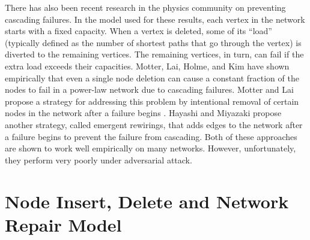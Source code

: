 \documentclass[11pt, letter]{article}
\begin{document}
There has also been recent research in the physics community on
preventing cascading failures.  In the model used for these results,
each vertex in the network starts with a fixed capacity. When a vertex
is deleted, some of its ``load'' (typically defined as the number of
shortest paths that go through the vertex) is diverted to the
remaining vertices.  The remaining vertices, in turn, can fail if the
extra load exceeds their capacities. Motter, Lai, Holme, and Kim have
shown empirically that even a single node deletion can cause a
constant fraction of the nodes to fail in a power-law network due to
cascading failures\cite{holme-2002-65, motter-2002-66}. Motter and Lai
propose a strategy for addressing this problem by intentional removal
of certain nodes in the network after a failure begins
\cite{motter-2004-93}.  Hayashi and Miyazaki propose another strategy,
called emergent rewirings, that adds edges to the network after a
failure begins to prevent the failure from
cascading\cite{hayashi2005}.  Both of these approaches are
shown to work well empirically on many networks.  However, unfortunately, they
perform very poorly under adversarial attack.

\section{Node Insert, Delete and Network Repair Model}
\label{sec:prelim}
 
\end{document}
